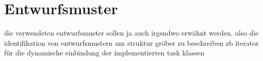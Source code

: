             
%                    
%        
%        
	
	\section{Entwurfsmuster}
	die verwendeten entwurfsmuster sollen ja auch irgendwo erwähnt werden.
	also die identifikation von entwurfsmustern um struktur gröber zu beschreiben
	zb iterator für die dynamische einbindung der implementierten task klassen
	        